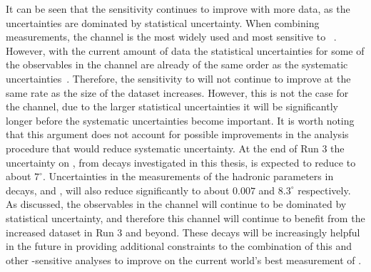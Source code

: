 It can be seen that the sensitivity continues to improve with more data, as the uncertainties are dominated by statistical uncertainty. When combining \Pgamma measurements, the \decay{\Bm}{\D\Km} channel is the most widely used and most sensitive to \Pgamma~\cite{LHCb-PAPER-2016-032}. However, with the current amount of data the statistical uncertainties for some of the \CP observables in the \decay{\Bm}{\D\Km} channel are already of the same order as the systematic uncertainties~\cite{LHCb-PAPER-2016-003}. Therefore, the sensitivity to \Pgamma will not continue to improve at the same rate as the size of the dataset increases. However, this is not the case for the \btodkst channel, due to the larger statistical uncertainties it will be significantly longer before the systematic uncertainties become important. It is worth noting that this argument does not account for possible improvements in the analysis procedure that would reduce systematic uncertainty. At the end of Run 3 the uncertainty on \Pgamma, from \btodkst decays investigated in this thesis, is expected to reduce to about $7^{\circ}$. Uncertainties in the measurements of the hadronic parameters in \btodkst decays, \rb and \deltab, will also reduce significantly to about $0.007$ and $8.3^{\circ}$ respectively. As discussed, the \CP observables in the \btodkst channel will continue to be dominated by statistical uncertainty, and therefore this channel will continue to benefit from the increased dataset in Run 3 and beyond. These \btodkst decays will be increasingly helpful in the future in providing additional constraints to the combination of this and other \Pgamma-sensitive analyses to improve on the current world's best measurement of \Pgamma.

\clearpage
